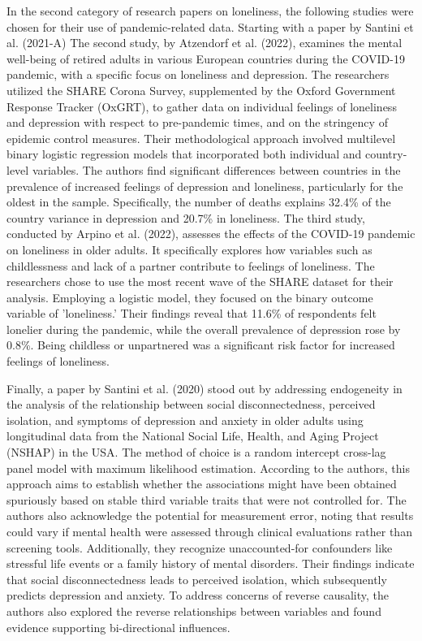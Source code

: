     In the second category of research papers on loneliness, the following studies were chosen for their use of pandemic-related data. Starting with a paper by Santini et al. (2021-A)
    The second study, by Atzendorf et al. (2022), examines the mental well-being of retired adults in various European countries during the COVID-19 pandemic, with a specific focus on loneliness and depression. The researchers utilized the SHARE Corona Survey, supplemented by the Oxford Government Response Tracker (OxGRT), to gather data on individual feelings of loneliness and depression with respect to pre-pandemic times, and on the stringency of epidemic control measures. Their methodological approach involved multilevel binary logistic regression models that incorporated both individual and country-level variables. The authors find significant differences between countries in the prevalence of increased feelings of depression and loneliness, particularly for the oldest in the sample. Specifically, the number of deaths explains 32.4\% of the country variance in depression and 20.7\% in loneliness.
    The third study, conducted by Arpino et al. (2022), assesses the effects of the COVID-19 pandemic on loneliness in older adults. It specifically explores how variables such as childlessness and lack of a partner contribute to feelings of loneliness. The researchers chose to use the most recent wave of the SHARE dataset for their analysis. Employing a logistic model, they focused on the binary outcome variable of 'loneliness.' Their findings reveal that 11.6\% of respondents felt lonelier during the pandemic, while the overall prevalence of depression rose by 0.8\%. Being childless or unpartnered was a significant risk factor for increased feelings of loneliness. 

    Finally, a paper by Santini et al. (2020) stood out by addressing endogeneity in the analysis of the relationship between social disconnectedness, perceived isolation, and symptoms of depression and anxiety in older adults using longitudinal data from the National Social Life, Health, and Aging Project (NSHAP) in the USA. 
    The method of choice is a random intercept cross-lag panel model with maximum likelihood estimation. According to the authors, this approach aims to establish whether the associations might have been obtained spuriously based on stable third variable traits that were not controlled for. The authors also acknowledge the potential for measurement error, noting that results could vary if mental health were assessed through clinical evaluations rather than screening tools. Additionally, they recognize unaccounted-for confounders like stressful life events or a family history of mental disorders. 
    Their findings indicate that social disconnectedness leads to perceived isolation, which subsequently predicts depression and anxiety. To address concerns of reverse causality, the authors also explored the reverse relationships between variables and found evidence supporting bi-directional influences.


